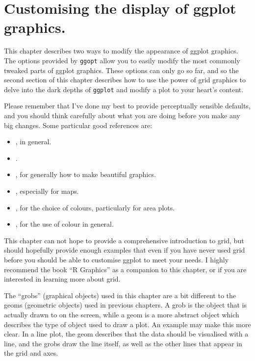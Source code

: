 


\chapter{Customising the display of ggplot graphics.}

This chapter describes two ways to modify the appearance of ggplot graphics.  The options provided by {\tt ggopt} allow you to easily modify the most commonly tweaked parts of ggplot graphics.  These options can only go so far, and so the second section of this chapter describes how to use the power of grid graphics to delve into the dark depths of {\tt ggplot} and modify a plot to your heart's content.  

Please remember that I've done my best to provide perceptually sensible defaults, and you should think carefully about what you are doing before you make any big changes.  Some particular good references are:

\begin{itemize}
	\item \citet{wilkinson:2006}, in general.
	\item \citet{cleveland:1993,cleveland:1987,cleveland:1994}.
	\item \citet{tufte:2006,tufte:1990,tufte:1997,tufte:2001}, for generally how to make beautiful graphics.
	\item \citet{bertin:1983,bertin:1967}, especially for maps.
	\item \citet{brewer:1994,brewer:1994a}, for the choice of colours, particularly for area plots.
	\item \citet{carr:1999,carr:1994,carr:2002}, for the use of colour in general.
\end{itemize}

This chapter can not hope to provide a comprehensive introduction to grid, but should hopefully provide enough examples that even if you have never used grid before you should be able to customise ggplot to meet your needs.  I highly recommend the book ``R Graphics'' \citep{murrell:2005} as a companion to this chapter, or if you are interested in learning more about grid.   

The ``grobs'' (graphical objects) used in this chapter are a bit different to the geoms (geometric objects) used in previous chapters.  A grob is the object that is actually drawn to on the screen, while a geom is a more abstract object which describes the type of object used to draw a plot.  An example may make this more clear. In a line plot, the geom describes that the data should be visualised with a line, and the grobs draw the line itself, as well as the other lines that appear in the grid and axes.

